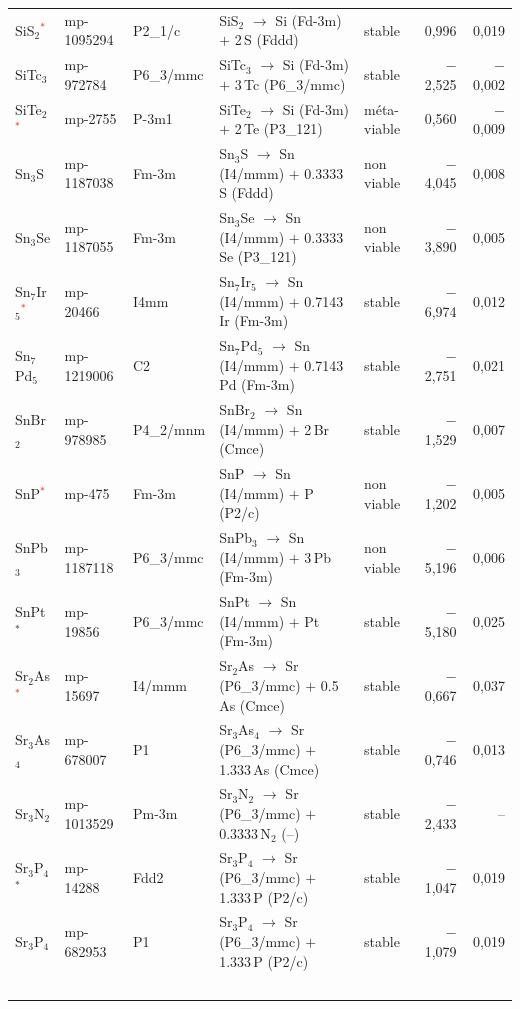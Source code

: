 \begin{longtable}{@{}ll l@{\hspace{4pt}} p{4.6cm} l@{\hspace{4pt}} rr@{}}
SiS$_{2}$\textcolor{red}{$^*$} & mp-1095294 & P2\_1/c & SiS$_{2}$ $\to$ Si (Fd-3m) $+$ 2\,S (Fddd) & stable & 0{,}996 & 0{,}019 \\
SiTc$_{3}$ & mp-972784 & P6\_3/mmc & SiTc$_{3}$ $\to$ Si (Fd-3m) $+$ 3\,Tc (P6\_3/mmc) & stable & $-$2{,}525 & $-$0{,}002 \\
SiTe$_{2}$\textcolor{red}{$^*$} & mp-2755 & P-3m1 & SiTe$_{2}$ $\to$ Si (Fd-3m) $+$ 2\,Te (P3\_121) & m\'eta-viable & 0{,}560 & $-$0{,}009 \\
Sn$_{3}$S & mp-1187038 & Fm-3m & Sn$_{3}$S $\to$ Sn (I4/mmm) $+$ 0.3333\,S (Fddd) & non viable & $-$4{,}045 & 0{,}008 \\
Sn$_{3}$Se & mp-1187055 & Fm-3m & Sn$_{3}$Se $\to$ Sn (I4/mmm) $+$ 0.3333\,Se (P3\_121) & non viable & $-$3{,}890 & 0{,}005 \\
Sn$_{7}$Ir$_{5}$\textcolor{red}{$^*$} & mp-20466 & I4mm & Sn$_{7}$Ir$_{5}$ $\to$ Sn (I4/mmm) $+$ 0.7143\,Ir (Fm-3m) & stable & $-$6{,}974 & 0{,}012 \\
Sn$_{7}$Pd$_{5}$ & mp-1219006 & C2 & Sn$_{7}$Pd$_{5}$ $\to$ Sn (I4/mmm) $+$ 0.7143\,Pd (Fm-3m) & stable & $-$2{,}751 & 0{,}021 \\
SnBr$_{2}$ & mp-978985 & P4\_2/mnm & SnBr$_{2}$ $\to$ Sn (I4/mmm) $+$ 2\,Br (Cmce) & stable & $-$1{,}529 & 0{,}007 \\
SnP\textcolor{red}{$^*$} & mp-475 & Fm-3m & SnP $\to$ Sn (I4/mmm) $+$ P (P2/c) & non viable & $-$1{,}202 & 0{,}005 \\
SnPb$_{3}$ & mp-1187118 & P6\_3/mmc & SnPb$_{3}$ $\to$ Sn (I4/mmm) $+$ 3\,Pb (Fm-3m) & non viable & $-$5{,}196 & 0{,}006 \\
SnPt$^*$ & mp-19856 & P6\_3/mmc & SnPt $\to$ Sn (I4/mmm) $+$ Pt (Fm-3m) & stable & $-$5{,}180 & 0{,}025 \\
Sr$_{2}$As\textcolor{red}{$^*$} & mp-15697 & I4/mmm & Sr$_{2}$As $\to$ Sr (P6\_3/mmc) $+$ 0.5\,As (Cmce) & stable & $-$0{,}667 & 0{,}037 \\
Sr$_{3}$As$_{4}$ & mp-678007 & P1 & Sr$_{3}$As$_{4}$ $\to$ Sr (P6\_3/mmc) $+$ 1.333\,As (Cmce) & stable & $-$0{,}746 & 0{,}013 \\
Sr$_{3}$N$_{2}$ & mp-1013529 & Pm-3m & Sr$_{3}$N$_{2}$ $\to$ Sr (P6\_3/mmc) $+$ 0.3333\,N$_{2}$ (--) & stable & $-$2{,}433 & -- \\
Sr$_{3}$P$_{4}$$^*$ & mp-14288 & Fdd2 & Sr$_{3}$P$_{4}$ $\to$ Sr (P6\_3/mmc) $+$ 1.333\,P (P2/c) & stable & $-$1{,}047 & 0{,}019 \\
Sr$_{3}$P$_{4}$ & mp-682953 & P1 & Sr$_{3}$P$_{4}$ $\to$ Sr (P6\_3/mmc) $+$ 1.333\,P (P2/c) & stable & $-$1{,}079 & 0{,}019 \\
$$
\end{longtable}
